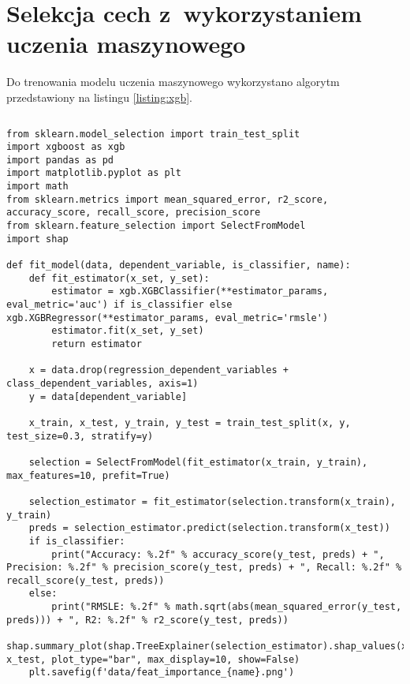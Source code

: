 \section{Selekcja cech z~wykorzystaniem uczenia maszynowego}\label{sec:analysis:feature-selection-xgb}

Do trenowania modelu uczenia maszynowego wykorzystano algorytm przedstawiony na listingu \ref{listing:xgb}.


\noindent\begin{minipage}{\textwidth}
             \begin{lstlisting}[caption={Algorytm uczenia modelu regresji}, label={listing:xgb}]
             \end{lstlisting}
             \hspace{.075\textwidth}\begin{minipage}{.85\textwidth}
                                        \begin{verbatim}
from sklearn.model_selection import train_test_split
import xgboost as xgb
import pandas as pd
import matplotlib.pyplot as plt
import math
from sklearn.metrics import mean_squared_error, r2_score, accuracy_score, recall_score, precision_score
from sklearn.feature_selection import SelectFromModel
import shap

def fit_model(data, dependent_variable, is_classifier, name):
    def fit_estimator(x_set, y_set):
        estimator = xgb.XGBClassifier(**estimator_params, eval_metric='auc') if is_classifier else xgb.XGBRegressor(**estimator_params, eval_metric='rmsle')
        estimator.fit(x_set, y_set)
        return estimator

    x = data.drop(regression_dependent_variables + class_dependent_variables, axis=1)
    y = data[dependent_variable]

    x_train, x_test, y_train, y_test = train_test_split(x, y, test_size=0.3, stratify=y)

    selection = SelectFromModel(fit_estimator(x_train, y_train), max_features=10, prefit=True)

    selection_estimator = fit_estimator(selection.transform(x_train), y_train)
    preds = selection_estimator.predict(selection.transform(x_test))
    if is_classifier:
        print("Accuracy: %.2f" % accuracy_score(y_test, preds) + ", Precision: %.2f" % precision_score(y_test, preds) + ", Recall: %.2f" % recall_score(y_test, preds))
    else:
        print("RMSLE: %.2f" % math.sqrt(abs(mean_squared_error(y_test, preds))) + ", R2: %.2f" % r2_score(y_test, preds))
    shap.summary_plot(shap.TreeExplainer(selection_estimator).shap_values(x_test), x_test, plot_type="bar", max_display=10, show=False)
    plt.savefig(f'data/feat_importance_{name}.png')
                                        \end{verbatim}
             \end{minipage}

             \raggedright\source{\ownwork}
             \vspace{0.75cm}
\end{minipage}

